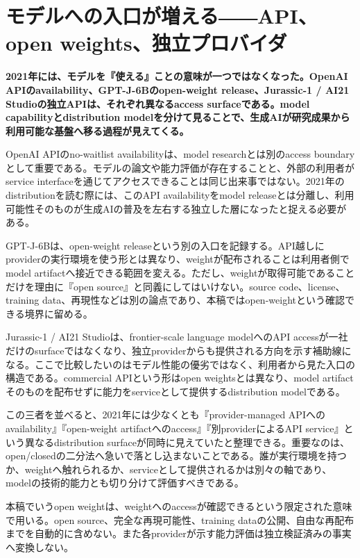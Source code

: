 \section{モデルへの入口が増える――API、open weights、独立プロバイダ}
\label{pkg:access-distribution}
\noindent\textbf{2021年には、モデルを『使える』ことの意味が一つではなくなった。OpenAI APIのavailability、GPT-J-6Bのopen-weight release、Jurassic-1 / AI21 Studioの独立APIは、それぞれ異なるaccess surfaceである。model capabilityとdistribution modelを分けて見ることで、生成AIが研究成果から利用可能な基盤へ移る過程が見えてくる。}\autocite{src-1b063a3564f3,src-b50beb89f16f,src-bf581c89a17f}

OpenAI APIのno-waitlist availabilityは、model researchとは別のaccess boundaryとして重要である。モデルの論文や能力評価が存在することと、外部の利用者がservice interfaceを通じてアクセスできることは同じ出来事ではない。2021年のdistributionを読む際には、このAPI availabilityをmodel releaseとは分離し、利用可能性そのものが生成AIの普及を左右する独立した層になったと捉える必要がある。\autocite{src-b50beb89f16f}


GPT-J-6Bは、open-weight releaseという別の入口を記録する。API越しにproviderの実行環境を使う形とは異なり、weightが配布されることは利用者側でmodel artifactへ接近できる範囲を変える。ただし、weightが取得可能であることだけを理由に『open source』と同義にしてはいけない。source code、license、training data、再現性などは別の論点であり、本稿ではopen-weightという確認できる境界に留める。\autocite{src-1b063a3564f3}


Jurassic-1 / AI21 Studioは、frontier-scale language modelへのAPI accessが一社だけのsurfaceではなくなり、独立providerからも提供される方向を示す補助線になる。ここで比較したいのはモデル性能の優劣ではなく、利用者から見た入口の構造である。commercial APIという形はopen weightsとは異なり、model artifactそのものを配布せずに能力をserviceとして提供するdistribution modelである。\autocite{src-bf581c89a17f}


この三者を並べると、2021年には少なくとも『provider-managed APIへのavailability』『open-weight artifactへのaccess』『別providerによるAPI service』という異なるdistribution surfaceが同時に見えていたと整理できる。重要なのは、open/closedの二分法へ急いで落とし込まないことである。誰が実行環境を持つか、weightへ触れられるか、serviceとして提供されるかは別々の軸であり、modelの技術的能力とも切り分けて評価すべきである。\autocite{src-1b063a3564f3,src-b50beb89f16f,src-bf581c89a17f}


\begin{claimboundary}
本稿でいうopen weightは、weightへのaccessが確認できるという限定された意味で用いる。open source、完全な再現可能性、training dataの公開、自由な再配布までを自動的に含めない。また各providerが示す能力評価は独立検証済みの事実へ変換しない。\autocite{src-1b063a3564f3,src-b50beb89f16f,src-bf581c89a17f}
\end{claimboundary}

